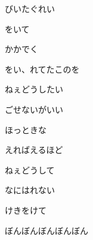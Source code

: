 \documentclass[a4paper,tate,twocolumn,12pt]{ltjtarticle}
\begin{document}
\begin{flushleft}
\begin{minipage}{\linewidth}
びいたぐれい

をいて

かかでく
\end{minipage}

\vspace{2em}

\noindent\begin{minipage}{\linewidth}
をい、れてたこのを

ねぇどうしたい

ごせないがいい

ほっときな

えればえるほど

ねぇどうして

なにはれない

けきをけて

ぼんぼんぼんぼんぼん
\end{minipage}

\end{flushleft}
\end{document}
